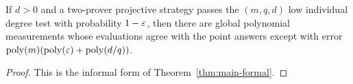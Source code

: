 \begin{theorem}\label{thm:main-informal}
	If $d > 0$ and a two-prover projective strategy passes the $(m,q,d)$ low individual degree test with probability $1-\varepsilon$, then there are global polynomial measurements whose evaluations agree with the point answers except with error $\operatorname{poly}(m)(\operatorname{poly}(\varepsilon)+\operatorname{poly}(d/q))$.
\end{theorem}
\begin{proof}
	This is the informal form of Theorem~\ref{thm:main-formal}.
\end{proof}
